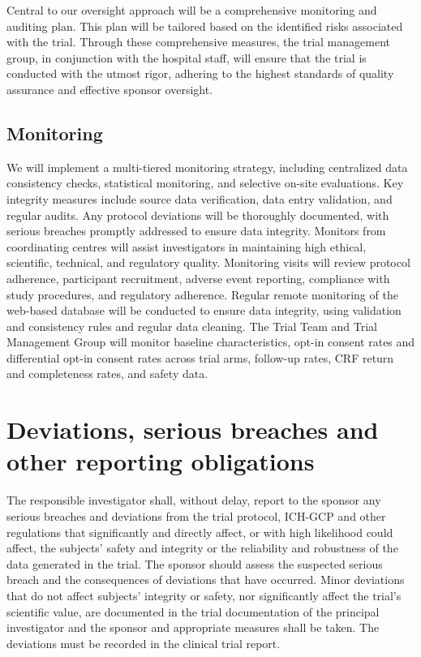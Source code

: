 \documentclass[
]{scrartcl}
\begin{document}
Central to our oversight approach will be a comprehensive monitoring and
auditing plan. This plan will be tailored based on the identified risks
associated with the trial. Through these comprehensive measures, the
trial management group, in conjunction with the hospital staff, will
ensure that the trial is conducted with the utmost rigor, adhering to
the highest standards of quality assurance and effective sponsor
oversight.

\subsection{Monitoring}\label{monitoring}

We will implement a multi-tiered monitoring strategy, including
centralized data consistency checks, statistical monitoring, and
selective on-site evaluations. Key integrity measures include source
data verification, data entry validation, and regular audits. Any
protocol deviations will be thoroughly documented, with serious breaches
promptly addressed to ensure data integrity. Monitors from coordinating
centres will assist investigators in maintaining high ethical,
scientific, technical, and regulatory quality. Monitoring visits will
review protocol adherence, participant recruitment, adverse event
reporting, compliance with study procedures, and regulatory adherence.
Regular remote monitoring of the web-based database will be conducted to
ensure data integrity, using validation and consistency rules and
regular data cleaning. The Trial Team and Trial Management Group will
monitor baseline characteristics, opt-in consent rates and differential
opt-in consent rates across trial arms, follow-up rates, CRF return and
completeness rates, and safety data.

\section{Deviations, serious breaches and other reporting
obligations}\label{deviations-serious-breaches-and-other-reporting-obligations}

The responsible investigator shall, without delay, report to the sponsor
any serious breaches and deviations from the trial protocol, ICH-GCP and
other regulations that significantly and directly affect, or with high
likelihood could affect, the subjects' safety and integrity or the
reliability and robustness of the data generated in the trial. The
sponsor should assess the suspected serious breach and the consequences
of deviations that have occurred. Minor deviations that do not affect
subjects' integrity or safety, nor significantly affect the trial's
scientific value, are documented in the trial documentation of the
principal investigator and the sponsor and appropriate measures shall be
taken. The deviations must be recorded in the clinical trial report.
\end{document}
